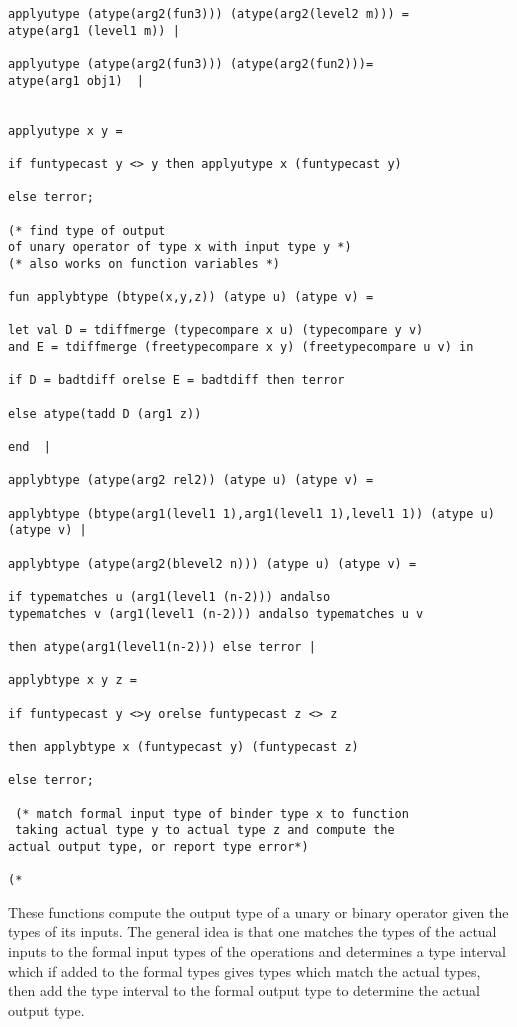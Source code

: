\documentclass{article}
\begin{document}
{{\begin{verbatim}
applyutype (atype(arg2(fun3))) (atype(arg2(level2 m))) =
atype(arg1 (level1 m)) |

applyutype (atype(arg2(fun3))) (atype(arg2(fun2)))=
atype(arg1 obj1)  |


applyutype x y = 

if funtypecast y <> y then applyutype x (funtypecast y)

else terror;

(* find type of output 
of unary operator of type x with input type y *)
(* also works on function variables *)

fun applybtype (btype(x,y,z)) (atype u) (atype v) = 

let val D = tdiffmerge (typecompare x u) (typecompare y v) 
and E = tdiffmerge (freetypecompare x y) (freetypecompare u v) in

if D = badtdiff orelse E = badtdiff then terror

else atype(tadd D (arg1 z))

end  |

applybtype (atype(arg2 rel2)) (atype u) (atype v) =

applybtype (btype(arg1(level1 1),arg1(level1 1),level1 1)) (atype u) (atype v) |

applybtype (atype(arg2(blevel2 n))) (atype u) (atype v) =

if typematches u (arg1(level1 (n-2))) andalso 
typematches v (arg1(level1 (n-2))) andalso typematches u v

then atype(arg1(level1(n-2))) else terror |

applybtype x y z = 

if funtypecast y <>y orelse funtypecast z <> z

then applybtype x (funtypecast y) (funtypecast z)

else terror;

 (* match formal input type of binder type x to function
 taking actual type y to actual type z and compute the
actual output type, or report type error*)

(*

\end{verbatim}

These functions compute the output type of a unary or binary operator given the types of its inputs.  The general idea is that one matches the types of the actual inputs
to the formal input types of the operations and determines a type interval which if added to the formal types gives types which match the actual types, then add the type interval
to the formal output type to determine the actual output type.

}}
\end{document}
